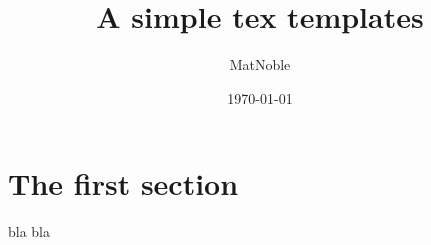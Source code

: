 \documentclass[a4paper, 12pt]{article}
\begin{document}
\title{\bf A simple tex templates}
\author{MatNoble}
\date{\today}

\maketitle
\tableofcontents

\clearpage

\section{The first section}

bla bla
\end{document}
